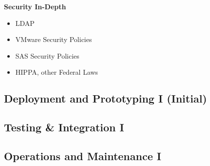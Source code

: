 \textbf{Security In-Depth}
\begin{itemize}
    \item LDAP
    \item VMware Security Policies
    \item SAS Security Policies
    \item HIPPA, other Federal Laws
\end{itemize}

\subsection{Deployment and Prototyping I (Initial)}

\subsection{Testing \& Integration I}

\subsection{Operations and Maintenance I}
